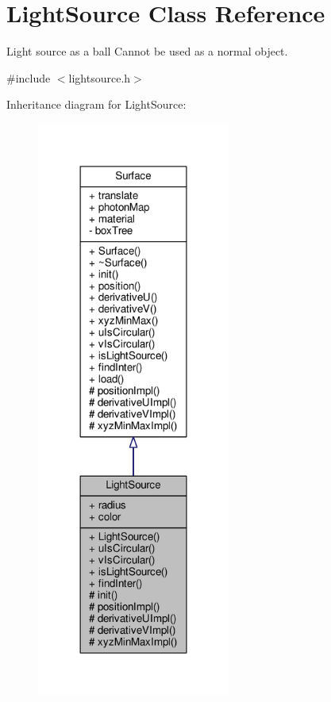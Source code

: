 \hypertarget{classLightSource}{}\section{Light\+Source Class Reference}
\label{classLightSource}


Light source as a ball Cannot be used as a normal object.  




{\ttfamily \#include $<$lightsource.\+h$>$}



Inheritance diagram for Light\+Source\+:\nopagebreak
\begin{figure}[H]
\begin{center}
\leavevmode
\includegraphics[width=180pt]{classLightSource__inherit__graph}
\end{center}
\end{figure}


